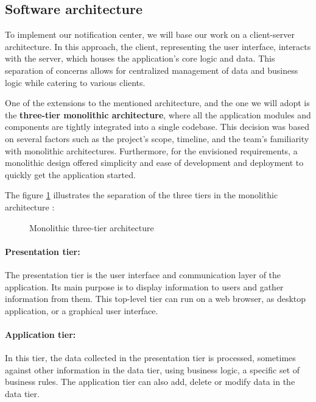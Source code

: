 \subsection{Software architecture}
To implement our notification center, we will base our work on a client-server architecture.
In this approach, the client, representing the user interface, interacts with the server, which houses
the application's core logic and data. This separation of concerns allows for centralized management
of data and business logic while catering to various clients.

One of the extensions to the mentioned architecture, and the one we will adopt is
the \textbf{three-tier monolithic architecture}, where all the application modules and components
are tightly integrated into a single codebase. This decision was based on several factors such as
the project's scope, timeline, and the team's familiarity with monolithic architectures.
Furthermore, for the envisioned requirements, a monolithic design offered simplicity and ease
of development and deployment to quickly get the application started.

\noindent The figure \ref{monolithic} illustrates the separation of the three tiers in the monolithic architecture : \\

\begin{figure}[hbt!]
      \centering
      
      \caption{Monolithic three-tier architecture}
      \label{monolithic}
\end{figure}

\paragraph*{Presentation tier:}
The presentation tier is the user interface and communication layer of the application. Its main purpose
is to display information to users and gather information from them. This top-level tier can run on a web
browser, as desktop application, or a graphical user interface.

\paragraph*{Application tier:}
In this tier, the data collected in the presentation tier is processed, sometimes against other
information in the data tier, using business logic, a specific set of business rules. The application
tier can also add, delete or modify data in the data tier.

